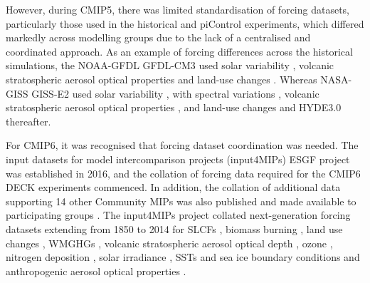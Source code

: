 \documentclass[manuscript]{copernicus}
\begin{document}
However, during CMIP5, there was limited standardisation of forcing datasets, particularly those used in the historical and piControl experiments, which differed markedly across modelling groups due to the lack of a centralised and coordinated approach. As an example of forcing differences across the historical simulations, the NOAA-GFDL GFDL-CM3 \citep{donner_dynamical_2011} used solar variability \citep{frohlich_solar_2004}, volcanic stratospheric aerosol optical properties \citep{stenchikov_arctic_2006} and land-use changes \citep{hurtt_underpinnings_2006}. Whereas NASA-GISS GISS-E2 \citep{miller_cmip5_2014} used solar variability \citep{wang_modeling_2005}, with spectral variations \citep[][updated 2009]{lean_new_2003}, volcanic stratospheric aerosol optical properties \citep[][updated]{sato_stratospheric_1993}, and land-use changes \citep[1850-1900;][]{pongratz_reconstruction_2008} and HYDE3.0 \citep[e.g.,][]{klein_goldewijk_hyde_2011} thereafter.

For CMIP6, it was recognised that forcing dataset coordination was needed. The input datasets for model intercomparison projects (input4MIPs) ESGF project was established in 2016, and the collation of forcing data required for the CMIP6 DECK experiments commenced. In addition, the collation of additional data supporting 14 other Community MIPs was also published and made available to participating groups \citep{durack_toward_2018}. The input4MIPs project collated next-generation forcing datasets extending from 1850 to 2014 for SLCFs \citep{hoesly_historical_2018,feng_generation_2020}, biomass burning \citep[e.g., fire;][]{van_marle_historic_2017}, land use changes \citep{hurtt_harmonization_2020}, WMGHGs \citep{meinshausen_historical_2017}, volcanic stratospheric aerosol optical depth \citep[e.g.,][]{thomason_global_2018}, ozone \citep{checa-garcia_historical_2018}, nitrogen deposition \citep{hegglin_ccmi_2016}, solar irradiance \citep{matthes_solar_2017}, SSTs and sea ice boundary conditions \citep{durack_pcmdi_2018} and anthropogenic aerosol optical properties \citep[e.g.,][]{fiedler_anthropogenic_2019}.
\end{document}

